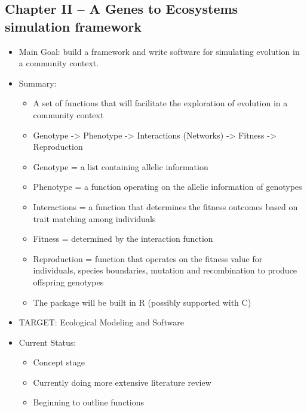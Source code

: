 \documentclass[12pt]{article}
\begin{document}
\subsection{Chapter II -- A Genes to Ecosystems simulation framework}
\begin{itemize}
\item Main Goal: build a framework and write software for simulating evolution in a
  community context.
\item Summary:
  \begin{itemize}
  \item A set of functions that will facilitate the exploration of
    evolution in a community context
  \item Genotype -> Phenotype -> Interactions (Networks) -> Fitness -> Reproduction
  \item Genotype = a list containing allelic information
  \item Phenotype = a function operating on the allelic information of
    genotypes
  \item Interactions = a function that determines the fitness outcomes
    based on trait matching among individuals
  \item Fitness = determined by the interaction function
  \item Reproduction = function that operates on the fitness value for
    individuals, species boundaries, mutation and recombination to
    produce offspring genotypes
  \item The package will be built in R (possibly supported with C)
  \end{itemize}
\item TARGET: Ecological Modeling and Software
\item Current Status: 
  \begin{itemize}
  \item Concept stage
  \item Currently doing more extensive literature review
  \item Beginning to outline functions
  \end{itemize}
\end{itemize}
\end{document}

